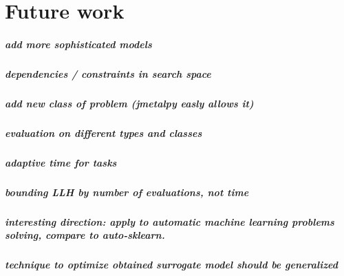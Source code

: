 \chapter{Future work}
\paragraph{add more sophisticated models}
\paragraph{dependencies / constraints in search space}
\paragraph{add new class of problem (jmetalpy easly allows it)}
\paragraph{evaluation on different types and classes}
\paragraph{adaptive time for tasks}
\paragraph{bounding LLH by number of evaluations, not time}
\paragraph{interesting direction: apply to automatic machine learning problems solving, compare to auto-sklearn.}
\paragraph{technique to optimize obtained surrogate model should be generalized}

